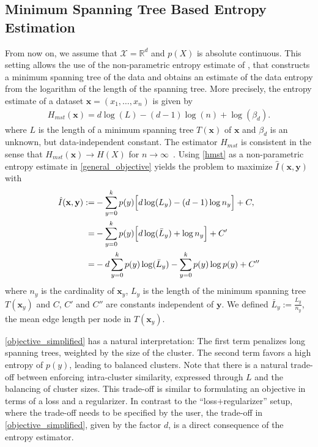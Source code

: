 \subsection{Minimum Spanning Tree Based Entropy Estimation}
From now on, we assume that $\mathcal{X}=\mathbb{R}^d$ and $p(X)$ is
absolute continuous.
This setting allows the use of the non-parametric entropy estimate of
\citet{hero1999asymptotic}, that constructs a minimum spanning tree of the data
and obtains an estimate of the data entropy from the logarithm of the length of
the spanning tree.
%
More precisely, the entropy estimate of a dataset $\mathbf{x} = (x_1, \dotsc, x_n)$ is given by
\begin{align}\label{hmst}
    H_{mst}(\mathbf{x}) = d \log(L) - (d-1) \log(n) + \log(\beta_d).
\end{align}
where $L$ is the length of a minimum spanning tree $T(\mathbf{x})$ of $\mathbf{x}$ and $\beta_d$ is an
unknown, but data-independent constant.
The estimator $H_{mst}$ is consistent in the sense that $H_{mst}(\mathbf{x}) \rightarrow H(X)$
for $n \rightarrow \infty$~\citep{hero1999asymptotic}.
Using \eqref{hmst} as a non-parametric entropy estimate in \eqref{general_objective} yields
the problem to maximize $\hat{I}(\mathbf{x}, \mathbf{y})$ with
\begin{align}\label{objective}
     \hat{I}(\mathbf{x}, \mathbf{y}) := & -\sum_{y=0}^k p(y) \Bigl[ d \log(L_y) - (d-1) \log{n_y} \Bigr] + C,\\
    = & - \sum_{y=0}^k p(y) \Bigl[ d \log(\bar{L}_y  ) + \log{n_y} \Bigr] + C'\\
    = & - d \sum_{y=0}^k p(y) \log(\bar{L}_y  ) - \sum_{y=0}^k p(y) \log{p(y) + C''} \label{objective_simplified}
\end{align}
where $n_y$ is the cardinality of $\mathbf{x}_y$, $L_y$ is the length of the
minimum spanning tree $T(\mathbf{x}_y)$ and $C$, $C'$ and $C''$ are constants independent of
$\mathbf{y}$.  We defined $\bar{L}_y := \frac{L_y}{n_y}$, the mean edge length
per node in $T(\mathbf{x}_y)$.

\eqref{objective_simplified} has a natural interpretation: The first term
penalizes long spanning trees, weighted by the size of the cluster. The second
term favors a high entropy of $p(y)$, leading to balanced clusters. Note that
there is a natural trade-off between enforcing intra-cluster similarity,
expressed through $L$ and the balancing of cluster sizes. This trade-off is
similar to formulating an objective in terms of a loss and a regularizer. In
contrast to the ``loss+regularizer'' setup, where the trade-off needs to be
specified by the user, the trade-off in \eqref{objective_simplified}, given by
the factor $d$, is a direct consequence of the entropy estimator.

